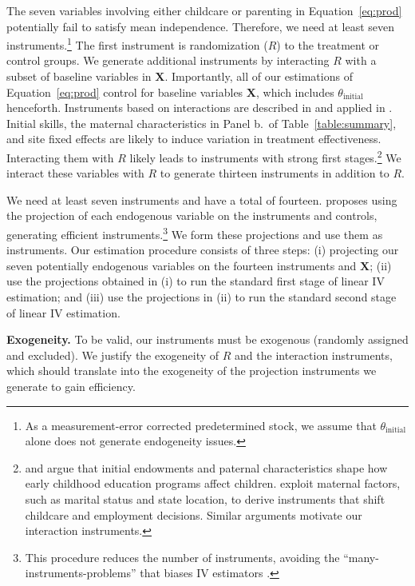 The seven variables involving either childcare or parenting in Equation~\eqref{eq:prod} potentially fail to satisfy mean independence. Therefore, we need at least seven instruments.\footnote{As a measurement-error corrected predetermined stock, we assume that $\theta_{\text{initial}}$ alone does not generate endogeneity issues.} The first instrument is randomization ($R$) to the treatment or control groups. We generate additional instruments by interacting $R$ with a subset of baseline variables in $\bm{X}$.  Importantly, all of our estimations of Equation~\eqref{eq:prod} control for baseline variables $\bm{X}$, which includes $\theta_{\text{initial}}$ henceforth. Instruments based on interactions are described in \citet{donaldChoosingNumberInstruments2001a} and applied in \citet{angristDoesCompulsorySchool1991}. Initial skills, the maternal characteristics in Panel b.\ of Table~\ref{table:summary}, and site fixed effects are likely to induce variation in treatment effectiveness. Interacting them with $R$ likely leads to instruments with strong first stages.\footnote{\citet{Elango_Hojman_etal_2016_Early-Edu} and \citet{heckmanEconomicsHumanDevelopment2014b} argue that initial endowments and paternal characteristics shape how early childhood education programs affect children. \citet{bernalChildCareChoices2011} exploit maternal factors, such as marital status and state location, to derive instruments that shift childcare and employment decisions. Similar arguments motivate our interaction instruments.} We interact these variables with $R$ to generate thirteen instruments in addition to $R$.

We need at least seven instruments and have a total of fourteen. \citet{neweyEfficientInstrumentalVariables1990} proposes using the projection of each endogenous variable on the instruments and controls, generating efficient instruments.\footnote{This procedure reduces the number of instruments, avoiding the ``many-instruments-problems'' that biases IV estimators \citep[][]{Stock2005asymptotic}.} We form these projections and use them as instruments. Our estimation procedure consists of three steps: (i) projecting our seven potentially endogenous variables on the fourteen instruments and $\bm{X}$; (ii) use the projections obtained in (i) to run the standard first stage of linear IV estimation; and (iii) use the projections in (ii) to run the standard second stage of linear IV estimation.

\noindent \textbf{Exogeneity.} To be valid, our instruments must be exogenous (randomly assigned and excluded). We justify the exogeneity of $R$ and the interaction instruments, which should translate into the exogeneity of the projection instruments we generate to gain efficiency. 

